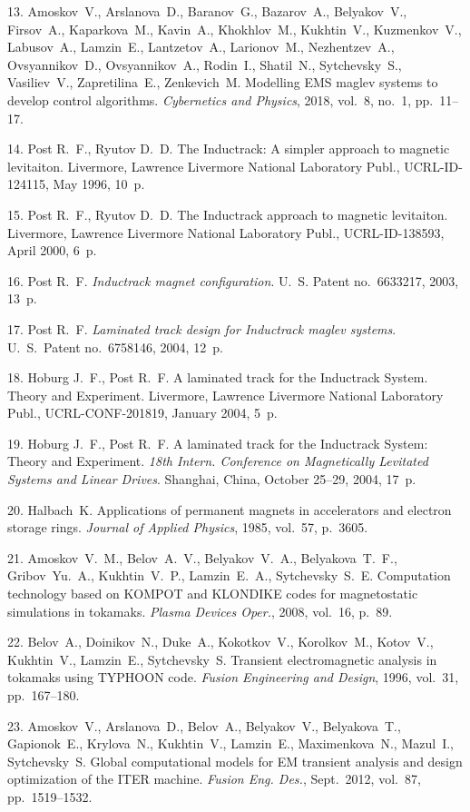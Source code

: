 {13. Amoskov~V., Arslanova~D., Baranov~G., Bazarov~A., Belyakov~V.,
Firsov~A., Kaparkova~M., Kavin~A., Khokhlov~M., Kukhtin~V.,
Kuzmenkov~V., Labusov~A., Lamzin~E., Lantzetov~A., Larionov~M.,
Nezhentzev~A., Ovsyannikov~D., Ovsyannikov~A., Rodin~I.,
Shatil~N., Sytchevsky~S., Vasiliev~V., Zapretilina~E.,
Zenkevich~M. Modelling EMS maglev systems to develop control
algorithms. {\em Cybernetics and Physics}, 2018, vol.~8, no.~1,
pp.~11--17.

14. Post R.~F., Ryutov D.~D. The Inductrack: A simpler approach to
magnetic levitaiton. Livermore, Lawrence Livermore National
Laboratory Publ., UCRL-ID-124115, May 1996, 10~p.

15. Post R.~F., Ryutov D.~D. The Inductrack approach to magnetic
levitaiton. Livermore, Lawrence Livermore National Laboratory
Publ., UCRL-ID-138593, April 2000, 6~p.

16. Post R.~F. {\em  Inductrack magnet configuration}. U.~S.
Patent no.~6633217, 2003, 13~p.

17. Post R.~F. {\em Laminated track design for Inductrack maglev
systems}. U.~S.~Patent no.~6758146, 2004, 12~p.

18. Hoburg J.~F., Post R.~F. A laminated track for the Inductrack
System. Theory and Experiment. Livermore, Lawrence Livermore
National Laboratory Publ., UCRL-CONF-201819, January 2004, 5~p.

19. Hoburg J.~F., Post R.~F. A laminated track for the Inductrack
System: Theory and Experiment. {\it 18th Intern. Conference on
Magnetically Levitated Systems and Linear Drives}. Shanghai,
China, October 25--29, 2004, 17~p.

20. Halbach~K. Applications of permanent magnets in accelerators
and electron storage rings. {\em Journal of Applied Physics},
1985, vol.~57, p.~3605.

21. Amoskov~V.~M., Belov~A.~V., Belyakov~V.~A., Belyakova~T.~F.,
Gribov~Yu.~A., Kukhtin~V.~P., Lamzin~E.~A., Sytchevsky~S.~E.
Computation technology based on KOMPOT and KLONDIKE codes for
magnetostatic simulations in tokamaks. {\em Plasma Devices Oper.},
2008, vol.~16, p.~89.

22. Belov~A., Doinikov~N., Duke~A., Kokotkov~V., Korolkov~M.,
Kotov~V., Kukhtin~V., Lamzin~E., Sytchevsky~S. Transient
electromagnetic analysis in tokamaks using TYPHOON code. {\em
Fusion Engineering and Design}, 1996, vol.~31, pp.~167--180.

23. Amoskov~V., Arslanova~D., Belov~A., Belyakov~V., Belyakova~T.,
Gapionok~E., Krylova~N., Kukhtin~V., Lamzin~E., Maximenkova~N.,
Mazul~I., Sytchevsky~S. Global computational models for EM
transient analysis and design optimization of the ITER machine.
{\em Fusion Eng. Des.}, Sept.~2012, vol.~87, pp.~1519--1532.

}
